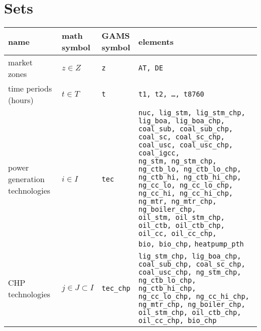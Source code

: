\documentclass[11pt,a4paper]{article}
\begin{document}
\section{Sets} \label{sets}
\begin{tabular}{l l l l}
\textbf{name} & \makecell[l]{\textbf{math} \\ \textbf{symbol}} & \makecell[l]{\textbf{GAMS} \\\textbf{symbol}} & \textbf{elements} \\
\hline \hline
market zones & $z \in Z$ & \texttt{z} & \texttt{AT, DE} \\ \hline

\makecell[l]{time periods \\(hours)} & $t \in T$ & \texttt{t} & \texttt{t1, t2, \ldots, t8760} \\ \hline

\makecell[l]{power \\generation \\technologies} & $i \in I$ & \texttt{tec} & 

\makecell[l]{ \texttt{nuc, lig\_stm, lig\_stm\_chp,}\\
	\texttt{lig\_boa, lig\_boa\_chp,} \\
	\texttt{coal\_sub, coal\_sub\_chp,} \\
	\texttt{coal\_sc, coal\_sc\_chp,}\\
	\texttt{coal\_usc, coal\_usc\_chp,} \\
	\texttt{coal\_igcc,}\\
	\texttt{ng\_stm, ng\_stm\_chp,} \\
	\texttt{ng\_ctb\_lo, ng\_ctb\_lo\_chp,}\\ 
	\texttt{ng\_ctb\_hi, ng\_ctb\_hi\_chp,}\\
	\texttt{ng\_cc\_lo, ng\_cc\_lo\_chp,}\\
	\texttt{ng\_cc\_hi, ng\_cc\_hi\_chp,}\\
	\texttt{ng\_mtr, ng\_mtr\_chp,} \\
	\texttt{ng\_boiler\_chp,} \\
	\texttt{oil\_stm, oil\_stm\_chp,} \\ 
	\texttt{oil\_ctb, oil\_ctb\_chp,} \\
	\texttt{oil\_cc, oil\_cc\_chp,} \\
	\texttt{bio, bio\_chp,}
	\texttt{heatpump\_pth} 
} \\ \hline

\makecell[l]{CHP \\technologies} & $j \in J \subset I$ & \texttt{tec\_chp} & \makecell[l]{
	\texttt{lig\_stm\_chp, lig\_boa\_chp,}\\
	\texttt{coal\_sub\_chp, coal\_sc\_chp,}\\
	\texttt{coal\_usc\_chp, ng\_stm\_chp,}\\ 
	\texttt{ng\_ctb\_lo\_chp, ng\_ctb\_hi\_chp,}\\
	\texttt{ng\_cc\_lo\_chp, ng\_cc\_hi\_chp,}\\
	\texttt{ng\_mtr\_chp, ng\_boiler\_chp,}\\
	\texttt{oil\_stm\_chp, oil\_ctb\_chp,} \\ 
	\texttt{oil\_cc\_chp, bio\_chp} } \\ \hline


\end{tabular}
\end{document}
